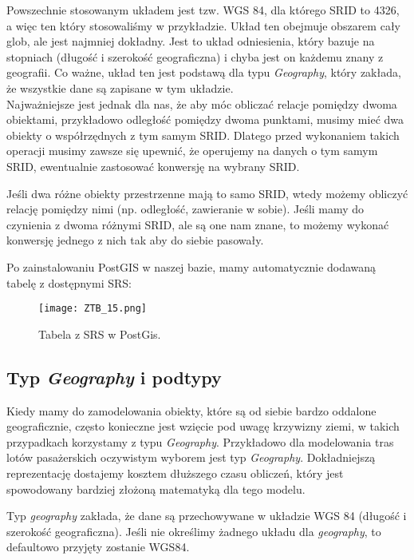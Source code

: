 \documentclass[a4paper,15pt]{article}
\newcommand{\issue}[2]{
    \begin{tcolorbox}[colback=issueColor!5!white,colframe=issueColor,title={Pamiętaj #1}]
        #2
    \end{tcolorbox}
}
\begin{document}
Powszechnie stosowanym układem jest tzw. WGS 84, dla którego SRID to 4326, a więc ten który stosowaliśmy w przykładzie. Układ ten obejmuje obszarem cały glob, ale jest najmniej dokładny. Jest to układ odniesienia, który bazuje na stopniach (długość i szerokość geograficzna) i chyba jest on każdemu znany z geografii. Co ważne, układ ten jest podstawą dla typu \textit{Geography}, który zakłada, że wszystkie dane są zapisane w tym układzie. \\

Najważniejsze jest jednak dla nas, że aby móc obliczać relacje pomiędzy dwoma obiektami, przykładowo odległość pomiędzy dwoma punktami, musimy mieć dwa obiekty o współrzędnych z tym samym SRID. Dlatego przed wykonaniem takich operacji musimy zawsze się upewnić, że operujemy na danych o tym samym SRID, ewentualnie zastosować konwersję na wybrany SRID. 

\issue{ - obliczanie relacji a SRID}{
Jeśli dwa różne obiekty przestrzenne mają to samo SRID, wtedy możemy obliczyć relację pomiędzy nimi (np. odległość, zawieranie w sobie). Jeśli mamy do czynienia z dwoma różnymi SRID, ale są one nam znane, to możemy wykonać konwersję jednego z nich tak aby do siebie pasowały.  
}

Po zainstalowaniu PostGIS w naszej bazie, mamy automatycznie dodawaną tabelę z dostępnymi SRS:

\begin{figure}[H]
\centering
  \texttt{[image: ZTB\_15.png]}
  \caption{Tabela z SRS w PostGis.}
\end{figure}




\subsection{Typ \textit{Geography} i podtypy}
Kiedy mamy do zamodelowania obiekty, które są od siebie bardzo oddalone geograficznie, często konieczne jest wzięcie pod uwagę krzywizny ziemi, w takich przypadkach korzystamy z typu \textit{Geography}. Przykładowo dla modelowania tras lotów pasażerskich oczywistym wyborem jest typ \textit{Geography}. Dokładniejszą reprezentację dostajemy kosztem dłuższego czasu obliczeń, który jest spowodowany bardziej złożoną matematyką dla tego modelu. \\

\issue{}{
Typ \textit{geography} zakłada, że dane są przechowywane w układzie WGS 84 (długość i szerokość geograficzna). Jeśli nie określimy żadnego układu dla \textit{geography}, to defaultowo przyjęty zostanie WGS84.
}
\end{document}
